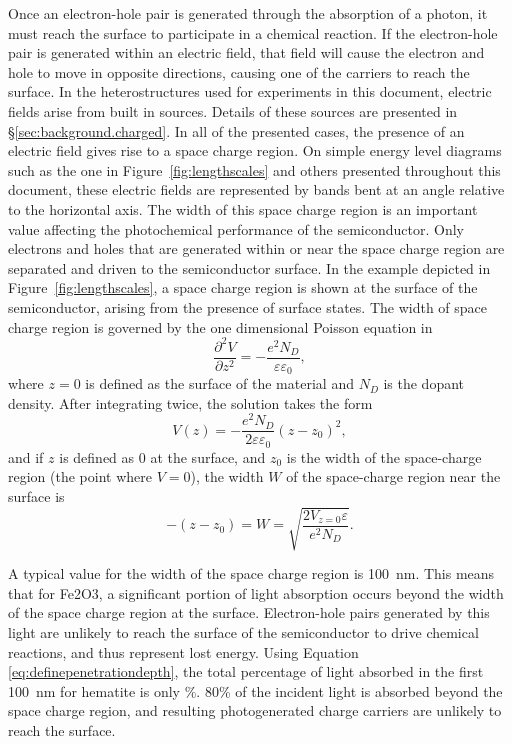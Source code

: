 \documentclass[12pt,%
              twoside,
               letterpaper]{uiothesis}
\begin{document}
Once an electron-hole pair is generated through the absorption of a photon, it must reach
the surface to participate in a chemical reaction. If the electron-hole pair is generated
within an electric field,  that field will cause the electron and hole to move in opposite
directions, causing one of the carriers to reach the surface. In the heterostructures used
for experiments in this document, electric fields arise from built in sources. Details of
these sources are presented in \S\ref{sec:background.charged}. In all of the presented
cases, the presence of an electric field gives rise to a space charge region. On simple
energy level diagrams such as the one in Figure~\ref{fig:lengthscales} and others presented
throughout this document, these electric fields are represented by bands bent at an angle
relative to the horizontal axis. The width of this space charge region is an important
value affecting the photochemical performance of the semiconductor. Only electrons and
holes that are generated within or near the space charge region are separated and driven
to the semiconductor surface. In the example depicted in Figure~\ref{fig:lengthscales}, a space
charge region is shown at the surface of the semiconductor, arising from the presence of
surface states. The width of space charge region is governed by the one dimensional
Poisson equation in 
\begin{equation}
	\label{eq:poisson}
	\frac{\partial^{2}V}{{\partial}z^{2}}=-\frac{e^{2}N_{D}}{\varepsilon \varepsilon_{0}},
\end{equation}
where $z=0$ is defined as the surface of the material and $N_{D}$ is the dopant density.
After integrating twice, the solution takes the form
\begin{equation}
	\label{eq:poissonsolved}
	V(z)=-\frac{e^{2}N_{D}}{2\varepsilon \varepsilon_{0}}(z-z_{0})^{2},
\end{equation}
and if $z$ is defined as 0 at the surface, and $z_{0}$ is the width of the space-charge
region (the point where $V=0$), the width $W$ of the space-charge region near the surface
is
\begin{equation}
	\label{eq:spacechargewidth}
	-(z-z_{0})=W=\sqrt{\frac{2V_{z=0}\varepsilon}{e^{2}N_{D}}}\text{.}
\end{equation}

A typical value for the width of the space charge region is \SI{100}{\nano\meter}. This
means that for Fe2O3, a significant portion of light absorption occurs beyond the
width of the space charge region at the surface. Electron-hole pairs generated by this
light are unlikely to reach the surface of the semiconductor to drive chemical reactions,
and thus represent lost energy. Using Equation \ref{eq:definepenetrationdepth}, the total
percentage of light absorbed in the first \SI{100}{\nano\meter} for hematite is only
\%. 80\% of the incident light is absorbed beyond the space charge region,
and resulting photogenerated charge carriers are unlikely to reach the surface.
\end{document}
